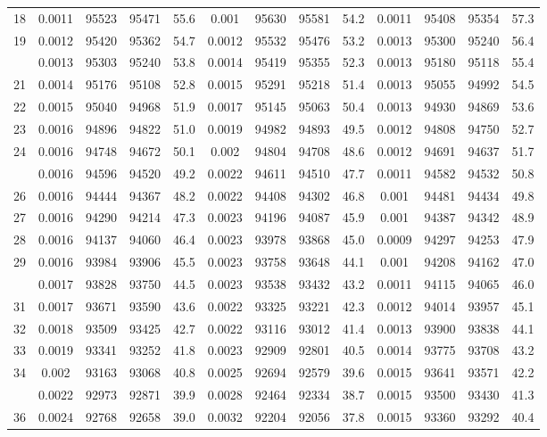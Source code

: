 \documentclass[
  14pt,
]{article}
\begin{document}
\begin{longtable}[t]{lcccccccccccc}
18 & 0.0011 & 95523 & 95471 & 55.6 & 0.001 & 95630 & 95581 & 54.2 & 0.0011 & 95408 & 95354 & 57.3\\
19 & 0.0012 & 95420 & 95362 & 54.7 & 0.0012 & 95532 & 95476 & 53.2 & 0.0013 & 95300 & 95240 & 56.4\\
\addlinespace
20 & 0.0013 & 95303 & 95240 & 53.8 & 0.0014 & 95419 & 95355 & 52.3 & 0.0013 & 95180 & 95118 & 55.4\\
21 & 0.0014 & 95176 & 95108 & 52.8 & 0.0015 & 95291 & 95218 & 51.4 & 0.0013 & 95055 & 94992 & 54.5\\
22 & 0.0015 & 95040 & 94968 & 51.9 & 0.0017 & 95145 & 95063 & 50.4 & 0.0013 & 94930 & 94869 & 53.6\\
23 & 0.0016 & 94896 & 94822 & 51.0 & 0.0019 & 94982 & 94893 & 49.5 & 0.0012 & 94808 & 94750 & 52.7\\
24 & 0.0016 & 94748 & 94672 & 50.1 & 0.002 & 94804 & 94708 & 48.6 & 0.0012 & 94691 & 94637 & 51.7\\
\addlinespace
25 & 0.0016 & 94596 & 94520 & 49.2 & 0.0022 & 94611 & 94510 & 47.7 & 0.0011 & 94582 & 94532 & 50.8\\
26 & 0.0016 & 94444 & 94367 & 48.2 & 0.0022 & 94408 & 94302 & 46.8 & 0.001 & 94481 & 94434 & 49.8\\
27 & 0.0016 & 94290 & 94214 & 47.3 & 0.0023 & 94196 & 94087 & 45.9 & 0.001 & 94387 & 94342 & 48.9\\
28 & 0.0016 & 94137 & 94060 & 46.4 & 0.0023 & 93978 & 93868 & 45.0 & 0.0009 & 94297 & 94253 & 47.9\\
29 & 0.0016 & 93984 & 93906 & 45.5 & 0.0023 & 93758 & 93648 & 44.1 & 0.001 & 94208 & 94162 & 47.0\\
\addlinespace
30 & 0.0017 & 93828 & 93750 & 44.5 & 0.0023 & 93538 & 93432 & 43.2 & 0.0011 & 94115 & 94065 & 46.0\\
31 & 0.0017 & 93671 & 93590 & 43.6 & 0.0022 & 93325 & 93221 & 42.3 & 0.0012 & 94014 & 93957 & 45.1\\
32 & 0.0018 & 93509 & 93425 & 42.7 & 0.0022 & 93116 & 93012 & 41.4 & 0.0013 & 93900 & 93838 & 44.1\\
33 & 0.0019 & 93341 & 93252 & 41.8 & 0.0023 & 92909 & 92801 & 40.5 & 0.0014 & 93775 & 93708 & 43.2\\
34 & 0.002 & 93163 & 93068 & 40.8 & 0.0025 & 92694 & 92579 & 39.6 & 0.0015 & 93641 & 93571 & 42.2\\
\addlinespace
35 & 0.0022 & 92973 & 92871 & 39.9 & 0.0028 & 92464 & 92334 & 38.7 & 0.0015 & 93500 & 93430 & 41.3\\
36 & 0.0024 & 92768 & 92658 & 39.0 & 0.0032 & 92204 & 92056 & 37.8 & 0.0015 & 93360 & 93292 & 40.4\\

\end{longtable}
\end{document}
